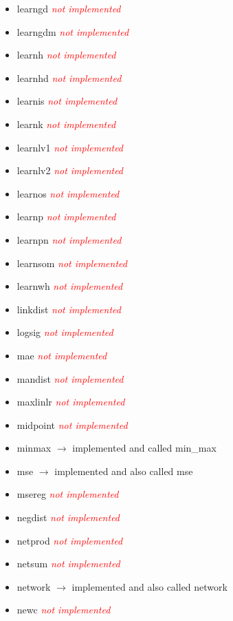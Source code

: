 \begin{itemize}
	\item learngd \textcolor{red}{\textit{not implemented}}
	\item learngdm \textcolor{red}{\textit{not implemented}}
	\item learnh \textcolor{red}{\textit{not implemented}}
	\item learnhd \textcolor{red}{\textit{not implemented}}
	\item learnis \textcolor{red}{\textit{not implemented}}
	\item learnk \textcolor{red}{\textit{not implemented}}
	\item learnlv1 \textcolor{red}{\textit{not implemented}} 
	\item learnlv2 \textcolor{red}{\textit{not implemented}}
	\item learnos \textcolor{red}{\textit{not implemented}}
	\item learnp \textcolor{red}{\textit{not implemented}}
	\item learnpn \textcolor{red}{\textit{not implemented}}
	\item learnsom \textcolor{red}{\textit{not implemented}}
	\item learnwh \textcolor{red}{\textit{not implemented}}
	\item linkdist \textcolor{red}{\textit{not implemented}}
	\item logsig \textcolor{red}{\textit{not implemented}}
	\item mae \textcolor{red}{\textit{not implemented}}
	\item mandist \textcolor{red}{\textit{not implemented}}
	\item maxlinlr \textcolor{red}{\textit{not implemented}}
	\item midpoint \textcolor{red}{\textit{not implemented}}
	\item minmax $\rightarrow$ implemented and called min\_max
	\item mse $\rightarrow$ implemented and also called mse
	\item msereg \textcolor{red}{\textit{not implemented}}
	\item negdist \textcolor{red}{\textit{not implemented}}
	\item netprod \textcolor{red}{\textit{not implemented}}
	\item netsum \textcolor{red}{\textit{not implemented}}
	\item network $\rightarrow$ implemented and also called network
	\item newc \textcolor{red}{\textit{not implemented}}

\end{itemize}
